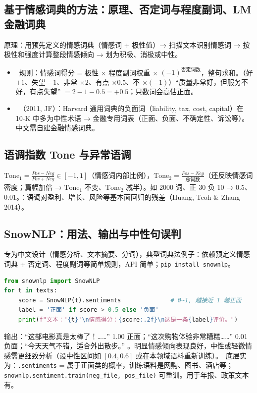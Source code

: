 \subsection{基于情感词典的方法：原理、否定词与程度副词、LM 金融词典}
原理：用预先定义的情感词典（情感词 + 极性值）→ 扫描文本识别情感词 → 按极性和强度计算整段情感倾向 → 划为积极、消极或中性。
\begin{itemize}
\item \tagext\ 规则：情感词得分 = 极性 × 程度副词权重 × $(-1)^{\text{否定词数}}$，整句求和。（好 $+1$、失望 $-1$、非常 $\times2$、有点 $\times0.5$、不 $\times(-1)$）“质量非常好，但服务不好，有点失望” $=2-1-0.5=+0.5$；只数词会高估正面。
\item \tagext\ （2011, JF）：Harvard 通用词典的负面词（liability, tax, cost, capital）在 10-K 中多为中性术语 → 金融专用词表（正面、负面、不确定性、诉讼等）。中文需自建金融情感词典。
\end{itemize}

\subsection{语调指数 Tone 与异常语调 \texorpdfstring{\tagext}{（拓展）}}
$\text{Tone}_1=\frac{Pos-Neg}{Pos+Neg}\in[-1,1]$（情感词内部比例），$\text{Tone}_2=\frac{Pos-Neg}{\text{总词数}}$（还反映情感词密度；篇幅加倍 → $\text{Tone}_1$ 不变、$\text{Tone}_2$ 减半）。如 2000 词、正 30 负 10 → 0.5、0.01。：语调对盈利、增长、风险等基本面回归的残差（Huang, Teoh \& Zhang 2014）。

\subsection{SnowNLP：用法、输出与中性句误判}
专为中文设计（情感分析、文本摘要、分词），典型词典法例子：依赖预定义情感词典 + 否定词、程度副词等简单规则，API 简单；\texttt{pip install snownlp}。
\begin{lstlisting}[language=Python]
from snownlp import SnowNLP
for t in texts:
    score = SnowNLP(t).sentiments              # 0~1, 越接近 1 越正面
    label = '正面' if score > 0.5 else '负面'
    print(f"文本：'{t}'\n情感得分：{score:.2f}\n这是一条{label}评价。")
\end{lstlisting}
输出：“这部电影真是太棒了！……” 1.00 正面；“这次购物体验非常糟糕……” 0.01 负面；“今天天气不错，适合外出散步。” 。明显情感倾向表现良好，中性或轻微情感需更细致分析（设中性区间如 $[0.4,0.6]$ 或在本领域语料重新训练）。\tagext\ 底层实为：\texttt{.sentiments} = 属于正面类的概率，训练语料是网购、图书、酒店等；\texttt{snownlp.sentiment.train(neg\_file, pos\_file)} 可重训。用于年报、政策文本有。


